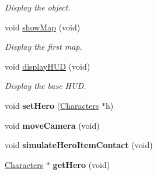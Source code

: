 \begin{DoxyCompactItemize}
\begin{DoxyCompactList}\small\item\em Display the object. \end{DoxyCompactList}\item 
void \hyperlink{class_game_ab1ab415f40c6a952da0f93a7bf3ffee1}{show\+Map} (void)
\begin{DoxyCompactList}\small\item\em Display the first map. \end{DoxyCompactList}\item 
void \hyperlink{class_game_a194dbc017575c98bda4e2317d266a67e}{display\+H\+U\+D} (void)
\begin{DoxyCompactList}\small\item\em Display the base H\+U\+D. \end{DoxyCompactList}\item 
\hypertarget{class_game_a381da7934d49206575ee04dbbd2cc8b4}{void {\bfseries set\+Hero} (\hyperlink{class_characters}{Characters} $\ast$h)}\label{class_game_a381da7934d49206575ee04dbbd2cc8b4}

\item 
\hypertarget{class_game_af294281f80678ee4d301ac8da495dd59}{void {\bfseries move\+Camera} (void)}\label{class_game_af294281f80678ee4d301ac8da495dd59}

\item 
\hypertarget{class_game_a4c343d4b5639da664429c9fcdea97086}{void {\bfseries simulate\+Hero\+Item\+Contact} (void)}\label{class_game_a4c343d4b5639da664429c9fcdea97086}

\item 
\hypertarget{class_game_a752983a71cb0c28fecc94eb4e1f03391}{\hyperlink{class_characters}{Characters} $\ast$ {\bfseries get\+Hero} (void)}\label{class_game_a752983a71cb0c28fecc94eb4e1f03391}

\end{DoxyCompactItemize}
